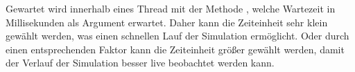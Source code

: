 Gewartet wird innerhalb eines Thread mit der Methode , welche Wartezeit in Millisekunden als Argument erwartet. Daher kann die Zeiteinheit sehr klein gewählt werden, was einen schnellen Lauf der Simulation ermöglicht. Oder durch einen entsprechenden Faktor kann die Zeiteinheit größer gewählt werden, damit der Verlauf der Simulation besser live beobachtet werden kann.


